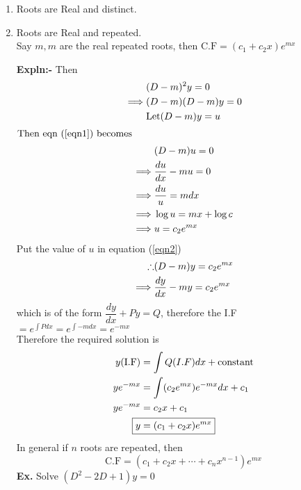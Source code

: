 \documentclass[a4paper, titlepage]{article}
\begin{document}
    \begin{enumerate}[label = \textbf{Case \arabic*:-}]
        \item Roots are Real and distinct.
        \item Roots are Real and repeated. \hfill \\
        Say $ m, m $ are the real repeated roots, then
        $ \text{C.F} = (c_1 + c_2x)e^{mx} $
        \item[\textbf{Expln:-}] Then
        \setcounter{equation}{0}
        \begin{align}
            \notag & \notag (D-m)^2y = 0 \notag \\
            \implies & (D-m)(D-m)y = 0 \\
            & \text{Let} (D-m)y = u
        \end{align} 
        $\text{Then eqn (\ref{eqn1}) becomes}$
        \begin{align}
            & (D-m)u = 0 \notag \notag \\
            \implies & \dfrac{du}{dx} - mu = 0 \notag \\
            \implies & \dfrac{du}{u} = mdx \notag \\
            \implies & \log u = mx + \log c \notag \\
            \implies & u = c_2e^{mx} \notag
        \end{align}
        Put the value of $u$ in equation (\ref{eqn2})
        \begin{align}
            \therefore & (D-m)y = c_2e^{mx} \notag \\
            \implies & \dfrac{dy}{dx} - my = c_2e^{mx} \notag
        \end{align}
        which is of the form $\dfrac{dy}{dx} + Py = Q$, 
        therefore the  I.F $= e^{\int Pdx} = e^{\int -mdx} = e^{-mx}$ \hfil \\
        Therefore the required solution is
        \begin{align*}
            y(\text{I.F}) &= \displaystyle\int Q(I.F)dx + \text{constant} \\
            ye^{-mx} &= \displaystyle\int (c_2e^{mx})e^{-mx}dx + c_1 \\
            ye^{-mx} &= c_2x + c_1 \\
            \Aboxed{y &= (c_1 + c_2x)e^{mx}}
        \end{align*}
        In general if $n$ roots are repeated, then 
        \[ \boxed{\text{C.F} = (c_1 + c_2x + \cdots + c_nx^{n-1})e^{mx}} \]
        \textbf{Ex.  } Solve $(D^2 - 2D + 1)y = 0$ \hfill \\

\end{enumerate}
\end{document}

